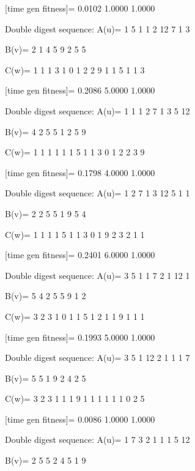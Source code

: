 [time gen fitness]=
    0.0102    1.0000    1.0000

Double digest sequence:
A(u)=
     1     5     1     1     2    12     7     1     3

B(v)=
     2     1     4     5     9     2     5     5

C(w)=
     1     1     1     3     1     0     1     2     2     9     1     1     5     1     1     3

[time gen fitness]=
    0.2086    5.0000    1.0000

Double digest sequence:
A(u)=
     1     1     1     2     7     1     3     5    12

B(v)=
     4     2     5     5     1     2     5     9

C(w)=
     1     1     1     1     1     1     5     1     1     3     0     1     2     2     3     9

[time gen fitness]=
    0.1798    4.0000    1.0000

Double digest sequence:
A(u)=
     1     2     7     1     3    12     5     1     1

B(v)=
     2     2     5     5     1     9     5     4

C(w)=
     1     1     1     1     5     1     1     3     0     1     9     2     3     2     1     1

[time gen fitness]=
    0.2401    6.0000    1.0000

Double digest sequence:
A(u)=
     3     5     1     1     7     2     1    12     1

B(v)=
     5     4     2     5     5     9     1     2

C(w)=
     3     2     3     1     0     1     1     5     1     2     1     1     9     1     1     1

[time gen fitness]=
    0.1993    5.0000    1.0000

Double digest sequence:
A(u)=
     3     5     1    12     2     1     1     1     7

B(v)=
     5     5     1     9     2     4     2     5

C(w)=
     3     2     3     1     1     1     9     1     1     1     1     1     1     0     2     5

[time gen fitness]=
    0.0086    1.0000    1.0000

Double digest sequence:
A(u)=
     1     7     3     2     1     1     1     5    12

B(v)=
     2     5     5     2     4     5     1     9

